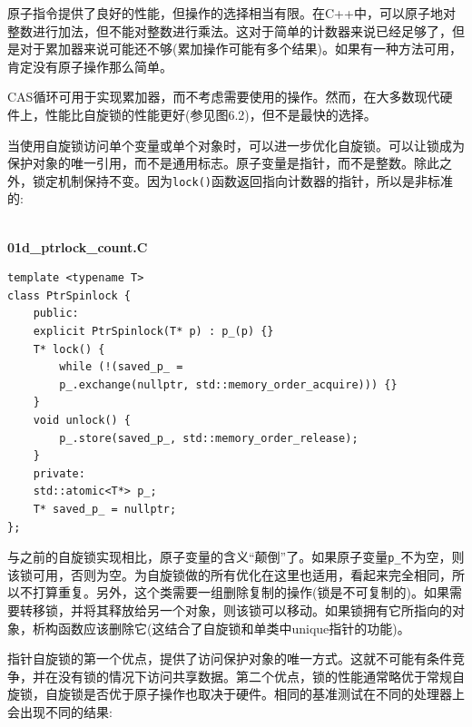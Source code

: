 原子指令提供了良好的性能，但操作的选择相当有限。在C++中，可以原子地对整数进行加法，但不能对整数进行乘法。这对于简单的计数器来说已经足够了，但是对于累加器来说可能还不够(累加操作可能有多个结果)。如果有一种方法可用，肯定没有原子操作那么简单。

CAS循环可用于实现累加器，而不考虑需要使用的操作。然而，在大多数现代硬件上，性能比自旋锁的性能更好(参见图6.2)，但不是最快的选择。

当使用自旋锁访问单个变量或单个对象时，可以进一步优化自旋锁。可以让锁成为保护对象的唯一引用，而不是通用标志。原子变量是指针，而不是整数。除此之外，锁定机制保持不变。因为\texttt{lock()}函数返回指向计数器的指针，所以是非标准的:

\hspace*{\fill} \\ %
\noindent
\textbf{01d\_ptrlock\_count.C}
\begin{lstlisting}[style=styleCXX]
template <typename T>
class PtrSpinlock {
	public:
	explicit PtrSpinlock(T* p) : p_(p) {}
	T* lock() {
		while (!(saved_p_ =
		p_.exchange(nullptr, std::memory_order_acquire))) {}
	}
	void unlock() {
		p_.store(saved_p_, std::memory_order_release);
	}
	private:
	std::atomic<T*> p_;
	T* saved_p_ = nullptr;
};
\end{lstlisting}

与之前的自旋锁实现相比，原子变量的含义“颠倒”了。如果原子变量\texttt{p\_}不为空，则该锁可用，否则为空。为自旋锁做的所有优化在这里也适用，看起来完全相同，所以不打算重复。另外，这个类需要一组删除复制的操作(锁是不可复制的)。如果需要转移锁，并将其释放给另一个对象，则该锁可以移动。如果锁拥有它所指向的对象，析构函数应该删除它(这结合了自旋锁和单类中unique指针的功能)。

指针自旋锁的第一个优点，提供了访问保护对象的唯一方式。这就不可能有条件竞争，并在没有锁的情况下访问共享数据。第二个优点，锁的性能通常略优于常规自旋锁，自旋锁是否优于原子操作也取决于硬件。相同的基准测试在不同的处理器上会出现不同的结果:

